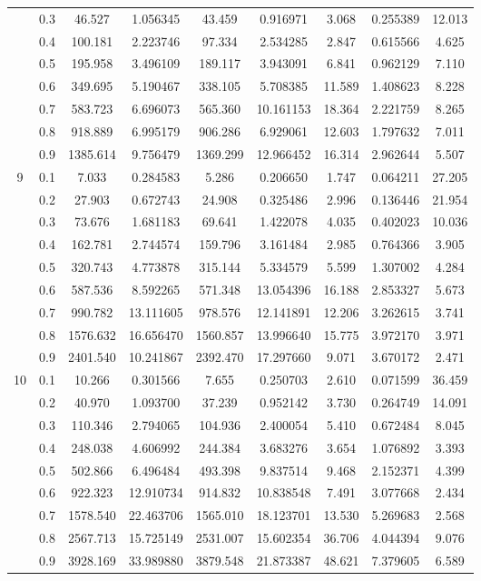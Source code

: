 \begin{longtable}{ | c | c || c | c | c | c | c | c | c | }
 & 0.3 & 46.527 & 1.056345 & 43.459 & 0.916971 & 3.068 & 0.255389 & 12.013 \\
 & 0.4 & 100.181 & 2.223746 & 97.334 & 2.534285 & 2.847 & 0.615566 & 4.625 \\
 & 0.5 & 195.958 & 3.496109 & 189.117 & 3.943091 & 6.841 & 0.962129 & 7.110 \\
 & 0.6 & 349.695 & 5.190467 & 338.105 & 5.708385 & 11.589 & 1.408623 & 8.228 \\
 & 0.7 & 583.723 & 6.696073 & 565.360 & 10.161153 & 18.364 & 2.221759 & 8.265 \\
 & 0.8 & 918.889 & 6.995179 & 906.286 & 6.929061 & 12.603 & 1.797632 & 7.011 \\
 & 0.9 & 1385.614 & 9.756479 & 1369.299 & 12.966452 & 16.314 & 2.962644 & 5.507 \\
 \hline
\multirow{9}{*}{9} & 0.1 & 7.033 & 0.284583 & 5.286 & 0.206650 & 1.747 & 0.064211 & 27.205 \\
 & 0.2 & 27.903 & 0.672743 & 24.908 & 0.325486 & 2.996 & 0.136446 & 21.954 \\
 & 0.3 & 73.676 & 1.681183 & 69.641 & 1.422078 & 4.035 & 0.402023 & 10.036 \\
 & 0.4 & 162.781 & 2.744574 & 159.796 & 3.161484 & 2.985 & 0.764366 & 3.905 \\
 & 0.5 & 320.743 & 4.773878 & 315.144 & 5.334579 & 5.599 & 1.307002 & 4.284 \\
 & 0.6 & 587.536 & 8.592265 & 571.348 & 13.054396 & 16.188 & 2.853327 & 5.673 \\
 & 0.7 & 990.782 & 13.111605 & 978.576 & 12.141891 & 12.206 & 3.262615 & 3.741 \\
 & 0.8 & 1576.632 & 16.656470 & 1560.857 & 13.996640 & 15.775 & 3.972170 & 3.971 \\
 & 0.9 & 2401.540 & 10.241867 & 2392.470 & 17.297660 & 9.071 & 3.670172 & 2.471 \\
 \hline
\multirow{9}{*}{10} & 0.1 & 10.266 & 0.301566 & 7.655 & 0.250703 & 2.610 & 0.071599 & 36.459 \\
 & 0.2 & 40.970 & 1.093700 & 37.239 & 0.952142 & 3.730 & 0.264749 & 14.091 \\
 & 0.3 & 110.346 & 2.794065 & 104.936 & 2.400054 & 5.410 & 0.672484 & 8.045 \\
 & 0.4 & 248.038 & 4.606992 & 244.384 & 3.683276 & 3.654 & 1.076892 & 3.393 \\
 & 0.5 & 502.866 & 6.496484 & 493.398 & 9.837514 & 9.468 & 2.152371 & 4.399 \\
 & 0.6 & 922.323 & 12.910734 & 914.832 & 10.838548 & 7.491 & 3.077668 & 2.434 \\
 & 0.7 & 1578.540 & 22.463706 & 1565.010 & 18.123701 & 13.530 & 5.269683 & 2.568 \\
 & 0.8 & 2567.713 & 15.725149 & 2531.007 & 15.602354 & 36.706 & 4.044394 & 9.076 \\
 & 0.9 & 3928.169 & 33.989880 & 3879.548 & 21.873387 & 48.621 & 7.379605 & 6.589 \\
 \hline
\hline
\end{longtable}
 
